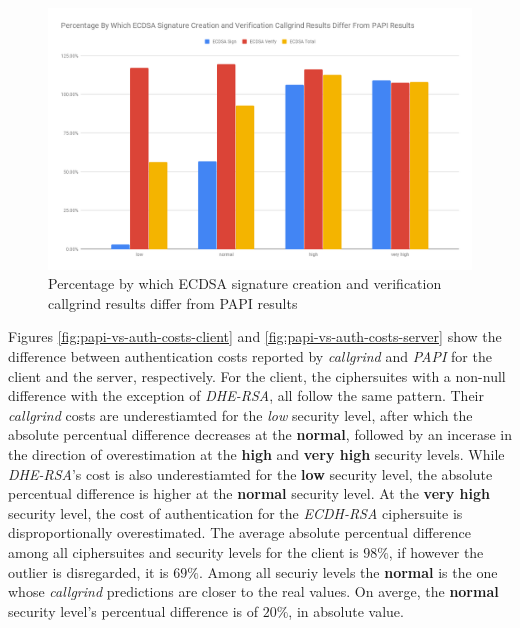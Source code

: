 \documentclass{llncs}
\begin{document}
\begin{figure}
  \centering
  \includegraphics[width=1.0\textwidth]{img/papi-vs-callgrind-ecdsa-cost.png}
  \centering \caption{\label{fig:papi-vs-callgrind-ecdsa-cost} Percentage by which ECDSA signature creation and verification callgrind results differ from PAPI results}
\end{figure}


Figures \ref{fig:papi-vs-auth-costs-client} and \ref{fig:papi-vs-auth-costs-server} show the difference between authentication costs reported by 
\textit{callgrind} and \textit{PAPI} for the client and the server, respectively. For the client, the ciphersuites with a non-null 
difference with the exception of \textit{DHE-RSA}, all follow the same pattern. Their \textit{callgrind} costs are underestiamted for the \textit{low} security level, 
after which the absolute percentual difference 
decreases at the \textbf{normal}, followed by an incerase in the direction of overestimation at the \textbf{high} and \textbf{very high}
security levels. While \textit{DHE-RSA}'s cost is also underestiamted for the \textbf{low} security level, the absolute percentual difference is 
higher at the  \textbf{normal} security level. At the \textbf{very high} security level, the cost of authentication for the \textit{ECDH-RSA} ciphersuite 
is disproportionally overestimated. The average absolute percentual difference among all ciphersuites and security levels for the client is $98\%$, 
if however the outlier is disregarded, it is $69\%$.
Among all securiy levels the \textbf{normal} is the one whose \textit{callgrind} predictions
are closer to the real values. On averge, the \textbf{normal} security level's percentual difference is of $20\%$, in absolute value.
\end{document}
